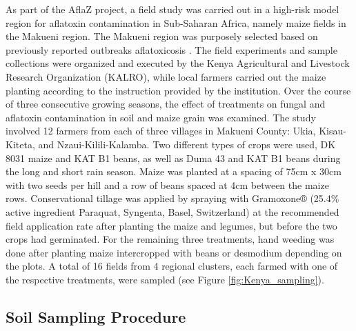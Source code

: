 \begin{refsection}
As part of the AflaZ project, a field study was carried out in a high-risk model region for aflatoxin contamination in Sub-Saharan Africa, namely maize fields in the Makueni region. The Makueni region was purposely selected based on previously reported outbreaks aflatoxicosis \citep{lewis2005aflatoxin}. The field experiments and sample collections were organized and executed by the Kenya Agricultural and Livestock Research Organization (KALRO), while local farmers carried out the maize planting according to the instruction provided by the institution. Over the course of three consecutive growing seasons, the effect of treatments on fungal and aflatoxin contamination in soil and maize grain was examined. The study involved 12 farmers from each of three villages in Makueni County: Ukia, Kisau-Kiteta, and Nzaui-Kilili-Kalamba. Two different types of crops were used, DK 8031 maize and KAT B1 beans, as well as Duma 43 and KAT B1 beans during the long and short rain season. Maize was planted at a spacing of 75cm x 30cm with two seeds per hill and a row of beans spaced at 4cm between the maize rows. Conservational tillage was applied by spraying with Gramoxone® (25.4\% active ingredient Paraquat, Syngenta, Basel, Switzerland) at the recommended field application rate after planting the maize and legumes, but before the two crops had germinated. For the remaining three treatments, hand weeding was done after planting maize intercropped with beans or desmodium depending on the plots. A total of 16 fields from 4 regional clusters, each farmed with one of the respective treatments, were sampled (see Figure \ref{fig:Kenya_sampling}).

\subsection{Soil Sampling Procedure}


\end{refsection}
